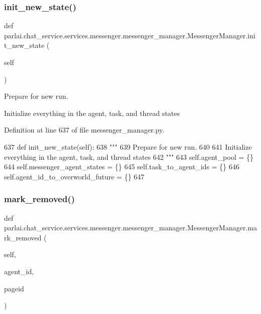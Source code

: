 \subsubsection{\texorpdfstring{init\+\_\+new\+\_\+state()}{init\_new\_state()}}
{\footnotesize\ttfamily def parlai.\+chat\+\_\+service.\+services.\+messenger.\+messenger\+\_\+manager.\+Messenger\+Manager.\+init\+\_\+new\+\_\+state (\begin{DoxyParamCaption}\item[{}]{self }\end{DoxyParamCaption})}

\begin{DoxyVerb}Prepare for new run.

Initialize everything in the agent, task, and thread states
\end{DoxyVerb}
 

Definition at line 637 of file messenger\+\_\+manager.\+py.


\begin{DoxyCode}
637     \textcolor{keyword}{def }init\_new\_state(self):
638         \textcolor{stringliteral}{"""}
639 \textcolor{stringliteral}{        Prepare for new run.}
640 \textcolor{stringliteral}{}
641 \textcolor{stringliteral}{        Initialize everything in the agent, task, and thread states}
642 \textcolor{stringliteral}{        """}
643         self.agent\_pool = \{\}
644         self.messenger\_agent\_states = \{\}
645         self.task\_to\_agent\_ids = \{\}
646         self.agent\_id\_to\_overworld\_future = \{\}
647 
\end{DoxyCode}
\mbox{\label{classparlai_1_1chat__service_1_1services_1_1messenger_1_1messenger__manager_1_1MessengerManager_a305c58cba4b22f99274b81a9253a4ca9}} 
\subsubsection{\texorpdfstring{mark\+\_\+removed()}{mark\_removed()}}
{\footnotesize\ttfamily def parlai.\+chat\+\_\+service.\+services.\+messenger.\+messenger\+\_\+manager.\+Messenger\+Manager.\+mark\+\_\+removed (\begin{DoxyParamCaption}\item[{}]{self,  }\item[{}]{agent\+\_\+id,  }\item[{}]{pageid }\end{DoxyParamCaption})}

